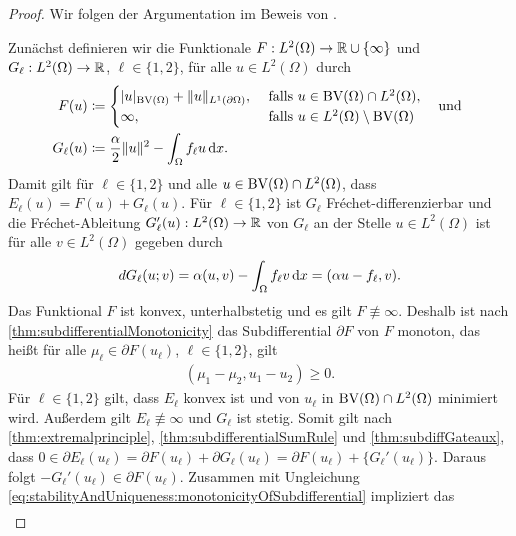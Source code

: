 \begin{proof}
  Wir folgen der Argumentation im Beweis von \cite[S. 304, Theorem 10.6]{Bar15}.

  Zunächst definieren wir die Funktionale $F: L^2(\Omega)\to
  \mathbb{R}\cup\{\infty\}$ und $G_\ell:L^2(\Omega)\to \mathbb{R}$, $\ell\in\{1,2\}$, für
  alle $u\in L^2(\Omega)$ durch
  \begin{align*}
    F(u) 
    &\coloneqq 
    \begin{cases}
      |u|_{\textup{BV}(\Omega)} + \Vert u \Vert_{L^1(\partial\Omega)}, 
      &\text{ falls } u\in\textup{BV}(\Omega)\cap L^2(\Omega),\\
      \infty,&\text{ falls } u\in L^2(\Omega)\setminus\textup{BV}(\Omega)
    \end{cases}
    \quad\text{und }\\
    G_\ell(u)
    &\coloneqq 
    \frac{\alpha}{2}\Vert u\Vert^2 - \int_\Omega f_\ell u\,\mathrm{d}x.
  \end{align*}
  Damit gilt für $\ell\in\{1,2\}$ und alle
  $u\in\textup{BV}(\Omega)\cap L^2(\Omega)$, dass $E_\ell(u) =  F(u)+G_\ell(u)$.
  Für $\ell\in\{1,2\}$ ist $G_\ell$ Fr\'echet-differenzierbar und die
  Fr\'echet-Ableitung $G_\ell'(u): L^2(\Omega)\to\mathbb{R}$ von $G_\ell$ an der
  Stelle $u\in L^2(\Omega)$ ist für alle $v\in L^2(\Omega)$
  gegeben durch
  \begin{align*}
    dG_\ell(u;v) = \alpha (u,v) - \int_\Omega f_\ell v\,\mathrm{d}x 
    = (\alpha u-f_\ell ,v).
  \end{align*}
  Das Funktional $F$ ist konvex, unterhalbstetig und es gilt $F\nequiv\infty$.
  Deshalb ist nach \cref{thm:subdifferentialMonotonicity} das Subdifferential
  $\partial F$ von $F$ monoton, das heißt für alle $\mu_\ell\in \partial
  F(u_\ell)$, $\ell\in\{1,2\}$, gilt
  \begin{align}\label{eq:stabilityAndUniqueness:monotonicityOfSubdifferential}
    (\mu_1-\mu_2,u_1-u_2)\geq 0.
  \end{align}
  Für $\ell\in\{1,2\}$ gilt, dass $E_\ell$ konvex ist und von $u_\ell$ in
  $\textup{BV}(\Omega)\cap L^2(\Omega)$ minimiert wird. 
  Außerdem gilt $E_\ell\nequiv\infty$ und $G_\ell$ ist stetig.
  Somit gilt nach \cref{thm:extremalprinciple}, 
  \cref{thm:subdifferentialSumRule} und \cref{thm:subdiffGateaux}, dass
  $0\in\partial E_\ell(u_\ell) = \partial F(u_\ell)+\partial
  G_\ell(u_\ell)=\partial F(u_\ell)+ \{G_\ell'(u_\ell)\}.$ 
  Daraus folgt
  $-G_\ell'(u_\ell)\in\partial F(u_\ell)$.
  Zusammen mit Ungleichung
  \eqref{eq:stabilityAndUniqueness:monotonicityOfSubdifferential}
  impliziert das
  \begin{align*}

\end{align*}
\end{proof}
